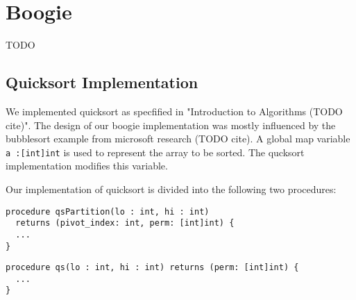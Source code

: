 \section{Boogie}\label{boogie_discussion}
TODO
\subsection{Quicksort Implementation}

We implemented quicksort as specfified in "Introduction to Algorithms (TODO cite)". 
The design of our boogie implementation was mostly influenced by the bubblesort example 
from microsoft research (TODO cite). A global map variable \texttt{a :[int]int} is used to represent the
array to be sorted. The qucksort implementation modifies this variable.

Our implementation of quicksort is divided into the following two procedures:
\begin{verbatim}
procedure qsPartition(lo : int, hi : int) 
  returns (pivot_index: int, perm: [int]int) {
  ...
}
\end{verbatim}

\begin{verbatim}
procedure qs(lo : int, hi : int) returns (perm: [int]int) {
  ...
}
\end{verbatim}

